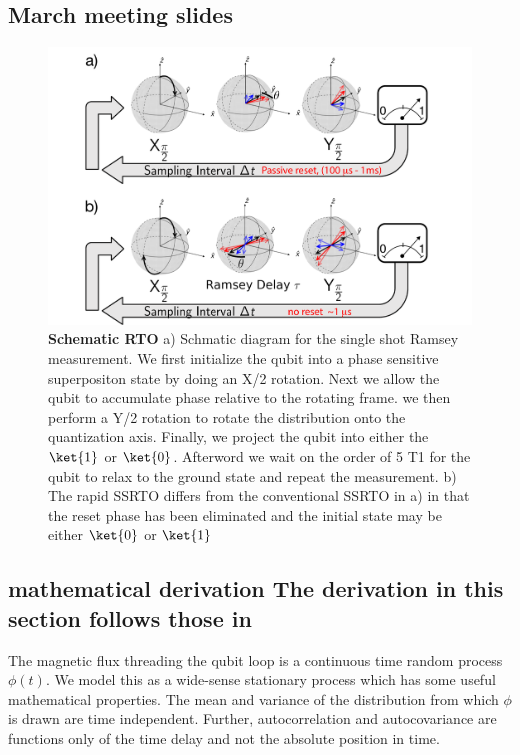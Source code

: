 \subsection{March meeting slides}
\begin{figure}[h]
    \begin{center}
    \includegraphics[width=175mm]{./PDF/ssrto_schematic_191001_646p.pdf}
    \end{center}
    \caption{\textbf{Schematic RTO}
    a) Schmatic diagram for the single shot Ramsey measurement.
    We first initialize the qubit into a phase sensitive superpositon state by doing an X/2 rotation.
    Next we allow the qubit to accumulate phase relative to the rotating frame.
    we then perform a Y/2 rotation to rotate the distribution onto the quantization axis.
    Finally, we project the qubit into either the $\ket{1}$ or $\ket{0}$.
    Afterword we wait on the order of 5 T1 for the qubit to relax to the ground state and repeat the measurement.
    b) The rapid SSRTO differs from the conventional SSRTO in a) in that the reset phase has been eliminated and the initial state may be either $\ket{0}$ or $\ket{1}$
    }
    \label{SSRTO Schematic}
\end{figure}

\subsection{mathematical derivation
The derivation in this section follows those in \citep{SankUnpublished, Yan2012, YanThesis}}

The magnetic flux threading the qubit loop is a continuous time random process $\phi (t)$.
We model this as a wide-sense stationary process which has some useful mathematical properties.
The mean and variance of the distribution from which $\phi$ is drawn are time independent.
Further, autocorrelation and autocovariance are functions only of the time delay and not the absolute position in time.


